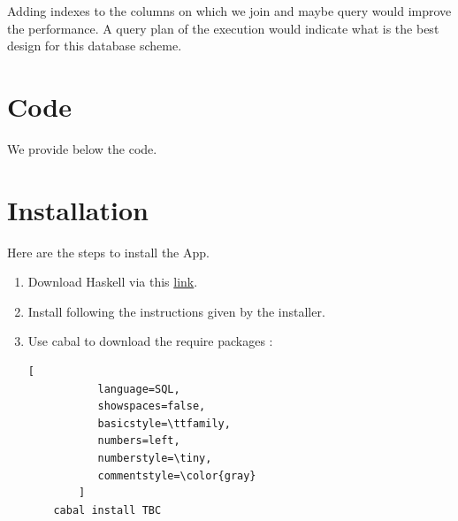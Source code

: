 \documentclass[12pt,a4paper,article]{memoir} %
\begin{document}
Adding indexes to the columns on which we join and maybe query would improve 
the performance. 
A query plan of the execution would indicate what is the best design for this 
database scheme.



\newpage
\appendix
{}

\chapter{Code} \label{apx:code}
We provide below the code.


\newpage
\chapter{Installation} \label{apx:installation}

Here are the steps to install the App.
\begin{enumerate}
	\item Download Haskell via this \href{https://www.haskell.org/platform/}{link}.
	\item Install following the instructions given by the installer.
	\item Use cabal to download the require packages :
\begin{lstlisting}[
           language=SQL,
           showspaces=false,
           basicstyle=\ttfamily,
           numbers=left,
           numberstyle=\tiny,
           commentstyle=\color{gray}
        ]
	cabal install TBC
\end{lstlisting}
\end{enumerate}
\end{document}
